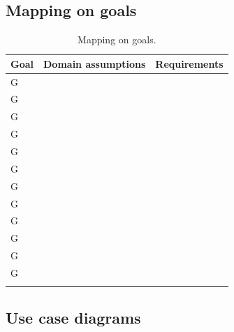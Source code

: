 \subsection{Mapping on goals}
\label{subsec: map_on_g}%
\setcounter{mg}{1}
\newcommand{\cmg}{\themg\stepcounter{mg}}
\begin{center}
    \begin{longtable}{|l|l|l|}
        \hline
        \textbf{Goal} & \textbf{Domain assumptions} & \textbf{Requirements} \\
        \hline
        G\cmg         &                             &                       \\
        \hline
        G\cmg         &                             &                       \\
        \hline
        G\cmg         &                             &                       \\
        \hline
        G\cmg         &                             &                       \\
        \hline
        G\cmg         &                             &                       \\
        \hline
        G\cmg         &                             &                       \\
        \hline
        G\cmg         &                             &                       \\
        \hline
        G\cmg         &                             &                       \\
        \hline
        G\cmg         &                             &                       \\
        \hline
        G\cmg         &                             &                       \\
        \hline
        G\cmg         &                             &                       \\
        \hline
        G\cmg         &                             &                       \\
        \hline
        \caption{Mapping on goals.}
        \label{tab: map_on_g}%
    \end{longtable}
\end{center}

\subsection{Use case diagrams}
\label{subsec: use_case_diag}%
